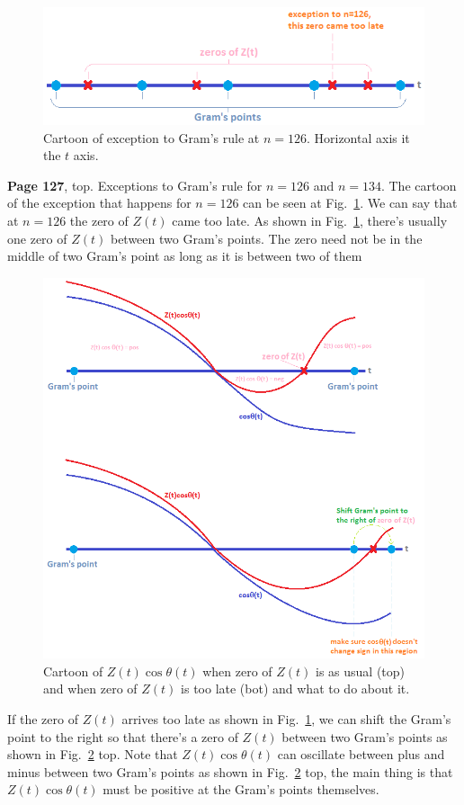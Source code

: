 \documentclass[aps,preprint,preprintnumbers,nofootinbib,showpacs,prd]{revtex4-1}
\begin{document}
%
\begin{figure}
\centering
  \includegraphics[width=0.78\linewidth]{gram1.png}
  \caption{Cartoon of exception to Gram's rule at $n=126$. Horizontal axis it the $t$ axis.}
\label{fig:gram_1}
\end{figure}
%
{\bf Page 127}, top. Exceptions to Gram's rule for $n=126$ and $n=134$. The cartoon of the exception that happens for $n=126$ can be seen at Fig.~\ref{fig:gram_1}. We can say that at $n=126$ the zero of $Z(t)$ came too late. As shown in Fig.~\ref{fig:gram_1}, there's usually one zero of $Z(t)$ between two Gram's points. The zero need not be in the middle of two Gram's point as long as it is between two of them
%
\begin{figure}
\centering
  \includegraphics[width=.78\linewidth]{gram2.png}
  \caption{Cartoon of $Z(t)\cos \theta(t)$ when zero of $Z(t)$ is as usual (top) and when zero of $Z(t)$ is too late (bot) and what to do about it.}
\label{fig:gram_2}
\end{figure}
%
If the zero of $Z(t)$ arrives too late as shown in Fig.~\ref{fig:gram_1}, we can shift the Gram's point to the right so that there's a zero of $Z(t)$ between two Gram's points as shown in Fig.~\ref{fig:gram_2} top. Note that $Z(t) \cos \theta(t)$ can oscillate between plus and minus between two Gram's points as shown in Fig.~\ref{fig:gram_2} top, the main thing is that $Z(t) \cos \theta(t)$ must be positive at the Gram's points themselves.
\end{document}

